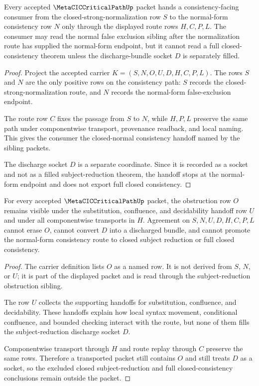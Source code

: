 \begin{theorem}
\label{thm:metacic-critical-path-consistency-handoff}
Every accepted $\MetaCICCriticalPathUp$ packet hands a consistency-facing consumer from the closed-strong-normalization row $S$ to the normal-form consistency row $N$ only through the displayed route rows $H,C,P,L$. The consumer may read the normal false exclusion sibling after the normalization route has supplied the normal-form endpoint, but it cannot read a full closed-consistency theorem unless the discharge-bundle socket $D$ is separately filled.
\end{theorem}
\begin{proof}
Project the accepted carrier $K=(S,N,O,U,D,H,C,P,L)$. The rows $S$ and $N$ are the only positive rows on the consistency path: $S$ records the closed-strong-normalization route, and $N$ records the normal-form false-exclusion endpoint.

The route row $C$ fixes the passage from $S$ to $N$, while $H,P,L$ preserve the same path under componentwise transport, provenance readback, and local naming. This gives the consumer the closed-normal consistency handoff named by the sibling packets.

The discharge socket $D$ is a separate coordinate. Since it is recorded as a socket and not as a filled subject-reduction theorem, the handoff stops at the normal-form endpoint and does not export full closed consistency.
\end{proof}

\begin{theorem}
\label{thm:metacic-critical-path-obstruction-boundary}
For every accepted $\MetaCICCriticalPathUp$ packet, the obstruction row $O$ remains visible under the substitution, confluence, and decidability handoff row $U$ and under all componentwise transports in $H$. Agreement on $S,N,U,D,H,C,P,L$ cannot erase $O$, cannot convert $D$ into a discharged bundle, and cannot promote the normal-form consistency route to closed subject reduction or full closed consistency.
\end{theorem}
\begin{proof}
The carrier definition lists $O$ as a named row. It is not derived from $S$, $N$, or $U$; it is part of the displayed packet and is read through the subject-reduction obstruction sibling.

The row $U$ collects the supporting handoffs for substitution, confluence, and decidability. These handoffs explain how local syntax movement, conditional confluence, and bounded checking interact with the route, but none of them fills the subject-reduction discharge socket $D$.

Componentwise transport through $H$ and route replay through $C$ preserve the same rows. Therefore a transported packet still contains $O$ and still treats $D$ as a socket, so the excluded closed subject-reduction and full closed-consistency conclusions remain outside the packet.
\end{proof}

